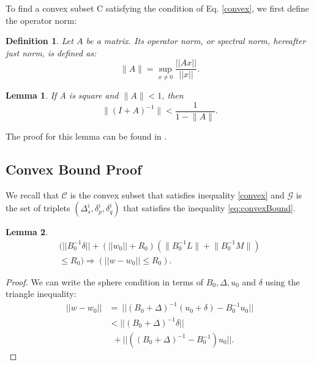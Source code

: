 \documentclass{vldb}
\newtheorem{lemma}{Lemma}
\newtheorem{definition}{Definition}
\begin{document}
\begin{appendix}
To find a convex subset C satisfying the condition of Eq. \ref{convex},
we first define the operator norm:
\begin{definition}
Let $A$ be a matrix. Its operator norm, or
spectral norm, hereafter just norm, is defined as:
\begin{equation}
\Big \| A \Big \| = \sup_{x \neq 0}\frac{||Ax||}{||x||}.
\end{equation}
\end{definition}

\begin{lemma} \label{lemma:newman}
If A is square and $\Big \| A \Big \| < 1$, then
\begin{equation*}
\Big \| (I+A)^{-1} \Big \| < \frac{1}{1- \Big \|A \Big \|}.
\end{equation*}
\end{lemma}
The proof for this lemma can be found in \cite{gabel2015monitoring}.

\subsection{Convex Bound Proof}
We recall that $\mathcal{C}$ is the convex subset that satisfies
inequality \ref{convex} and $\mathcal{G}$ is the set of triplets
$(\Delta_s^i, \delta_p^i, \delta_q^i)$
 that satisfies the inequality \ref{eq:convexBound}.

\begin{lemma} \label{GinC}
\begin{equation}
\begin{split}
(||B_0^{-1}\delta|| + (||w_0||+R_0)(\Big \|B_0^{-1}L\Big \|+\Big \|B_0^{-1}M\Big \|) \\
 \leq R_0) \Rightarrow (||w-w_0|| \leq R_0).
\end{split}
\end{equation}
\end{lemma}

\begin{proof}
We can write the sphere condition in terms of $B_0, \Delta, u_0$ and $\delta$ using the triangle
inequality:
\begin{equation} \label{in}
\begin{split}
||w-w_0|| & = \ ||(B_0+\Delta)^{-1}(u_0+\delta) - B_0^{-1}u_0|| \\
& < ||(B_0+\Delta)^{-1}\delta|| \\
& \ \ + ||((B_0+\Delta)^{-1} - B_0^{-1})u_0||.
\end{split}
\end{equation}


\end{proof}
\end{appendix}
\end{document}
